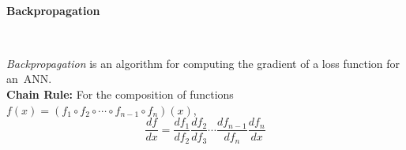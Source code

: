 \documentclass[12pt]{amsart}
\theoremstyle{definition}
\begin{document}
	
\thispagestyle{fancy}
\pagestyle{fancy}
	
	\
 
\begin{center}
    {\Large \bf {\sc Backpropagation}}
\end{center}

\

\textit{Backpropagation} is an algorithm for computing the gradient of a loss function for an~ANN. \\

\noindent \textbf{Chain Rule:} For the composition of functions $f(x) = (f_1 \circ f_{2} \circ \cdots \circ f_{n-1} \circ f_n) (x)$,
    \[
        \frac{df}{dx} = \frac{df_1}{df_2} \frac{df_2}{df_3} \cdots \frac{df_{n-1}}{df_n} \frac{df_n}{dx}
    \]
\end{document}
